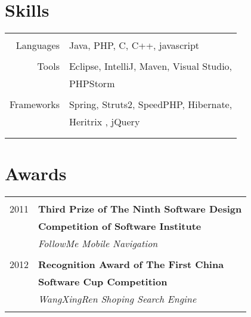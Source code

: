 \documentclass[10pt]{article} %
\begin{document}
{\begin{minipage}[t]{0.42\textwidth}

\section{Skills} 

\begin{tabular}{rl}
& \\
Languages
& Java, PHP, C, C++, javascript\\ 
& \\
Tools
& Eclipse, IntelliJ, Maven, Visual Studio,\\
& PHPStorm\\
& \\
Frameworks
& Spring, Struts2, SpeedPHP, Hibernate,\\
& Heritrix , jQuery\\
& \\ \\
\end{tabular}


\section{Awards} 

\begin{tabular}{rl}
& \\
2011	 & \textbf{Third Prize of The Ninth Software Design}\\
& \textbf{Competition of Software Institute}\\
& \textit{FollowMe Mobile Navigation}\\ \\


2012	 & \textbf{Recognition Award of The First China} \\ 
& \textbf{Software Cup Competition}\\
& \textit{WangXingRen Shoping Search Engine}\\ 
& \\
\end{tabular}\\[10pt]



\end{minipage}}
\end{document}
